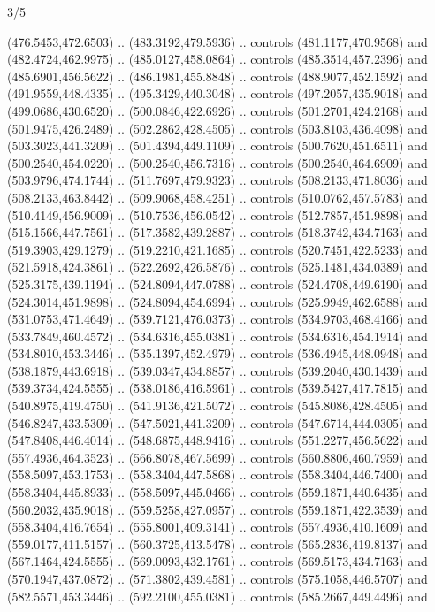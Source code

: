 \begin{flagdescription}{3/5}
\begin{scope}[xshift=0.5\flaglength]
\begin{scope}[scale=0.00167\flagwidth,yshift=210.9mm,xshift=-175.8mm]
\begin{scope}[y=-1pt, x=1pt]
  (476.5453,472.6503) .. (483.3192,479.5936) .. controls (481.1177,470.9568) and
  (482.4724,462.9975) .. (485.0127,458.0864) .. controls (485.3514,457.2396) and
  (485.6901,456.5622) .. (486.1981,455.8848) .. controls (488.9077,452.1592) and
  (491.9559,448.4335) .. (495.3429,440.3048) .. controls (497.2057,435.9018) and
  (499.0686,430.6520) .. (500.0846,422.6926) .. controls (501.2701,424.2168) and
  (501.9475,426.2489) .. (502.2862,428.4505) .. controls (503.8103,436.4098) and
  (503.3023,441.3209) .. (501.4394,449.1109) .. controls (500.7620,451.6511) and
  (500.2540,454.0220) .. (500.2540,456.7316) .. controls (500.2540,464.6909) and
  (503.9796,474.1744) .. (511.7697,479.9323) .. controls (508.2133,471.8036) and
  (508.2133,463.8442) .. (509.9068,458.4251) .. controls (510.0762,457.5783) and
  (510.4149,456.9009) .. (510.7536,456.0542) .. controls (512.7857,451.9898) and
  (515.1566,447.7561) .. (517.3582,439.2887) .. controls (518.3742,434.7163) and
  (519.3903,429.1279) .. (519.2210,421.1685) .. controls (520.7451,422.5233) and
  (521.5918,424.3861) .. (522.2692,426.5876) .. controls (525.1481,434.0389) and
  (525.3175,439.1194) .. (524.8094,447.0788) .. controls (524.4708,449.6190) and
  (524.3014,451.9898) .. (524.8094,454.6994) .. controls (525.9949,462.6588) and
  (531.0753,471.4649) .. (539.7121,476.0373) .. controls (534.9703,468.4166) and
  (533.7849,460.4572) .. (534.6316,455.0381) .. controls (534.6316,454.1914) and
  (534.8010,453.3446) .. (535.1397,452.4979) .. controls (536.4945,448.0948) and
  (538.1879,443.6918) .. (539.0347,434.8857) .. controls (539.2040,430.1439) and
  (539.3734,424.5555) .. (538.0186,416.5961) .. controls (539.5427,417.7815) and
  (540.8975,419.4750) .. (541.9136,421.5072) .. controls (545.8086,428.4505) and
  (546.8247,433.5309) .. (547.5021,441.3209) .. controls (547.6714,444.0305) and
  (547.8408,446.4014) .. (548.6875,448.9416) .. controls (551.2277,456.5622) and
  (557.4936,464.3523) .. (566.8078,467.5699) .. controls (560.8806,460.7959) and
  (558.5097,453.1753) .. (558.3404,447.5868) .. controls (558.3404,446.7400) and
  (558.3404,445.8933) .. (558.5097,445.0466) .. controls (559.1871,440.6435) and
  (560.2032,435.9018) .. (559.5258,427.0957) .. controls (559.1871,422.3539) and
  (558.3404,416.7654) .. (555.8001,409.3141) .. controls (557.4936,410.1609) and
  (559.0177,411.5157) .. (560.3725,413.5478) .. controls (565.2836,419.8137) and
  (567.1464,424.5555) .. (569.0093,432.1761) .. controls (569.5173,434.7163) and
  (570.1947,437.0872) .. (571.3802,439.4581) .. controls (575.1058,446.5707) and
  (582.5571,453.3446) .. (592.2100,455.0381) .. controls (585.2667,449.4496) and

\end{scope}
\end{scope}
\end{scope}
\end{flagdescription}
